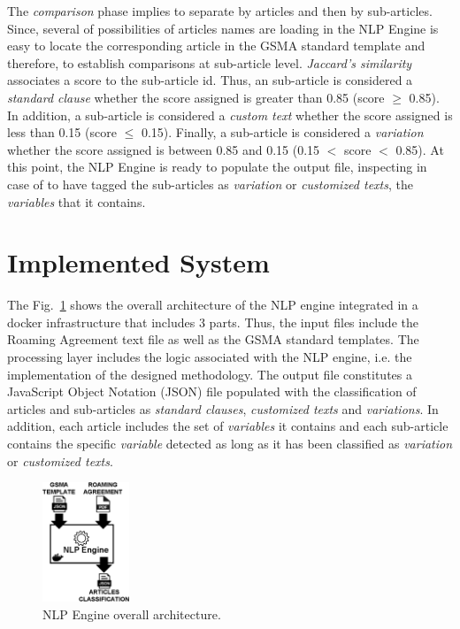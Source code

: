 The \textit{comparison} phase implies to separate by articles and then by sub-articles. Since, several of possibilities of articles names are loading in the NLP Engine is easy to locate the corresponding article in the GSMA standard template and therefore, to establish comparisons at sub-article level. \textit{Jaccard's similarity} associates a score to the sub-article id. Thus, an sub-article is considered a \textit{standard clause} whether the score assigned is greater than 0.85 (score $\geq$ 0.85). In addition, a sub-article is considered a \textit{custom text} whether the score assigned is less than 0.15 (score $\leq$ 0.15). Finally, a sub-article is considered a \textit{variation} whether the score assigned is between 0.85 and 0.15 (0.15 $<$ score $<$ 0.85). At this point, the NLP Engine is ready to populate the output file, inspecting in case of to have tagged the sub-articles as \textit{variation} or \textit{customized texts}, the \textit{variables} that it contains.

\section{Implemented System}
The Fig.~\ref{fig2} shows the overall architecture of the NLP engine integrated in a docker infrastructure that includes 3 parts. Thus, the input files include the Roaming Agreement text file as well as the GSMA standard templates. The processing layer includes the logic associated with the NLP engine, i.e. the implementation of the designed methodology. The output file constitutes a JavaScript Object Notation (JSON) file populated with the classification of articles and sub-articles as \textit{standard clauses}, \textit{customized texts} and \textit{variations}. In addition, each article includes the set of \textit{variables} it contains and each sub-article contains the specific \textit{variable} detected as long as it has been classified as \textit{variation} or \textit{customized texts}.

\begin{figure}[htbp]
\centerline{\includegraphics[width=0.23\textwidth]{images/NLP_Engine.png}}
\caption{NLP Engine overall architecture.}
\label{fig2}
\end{figure}

